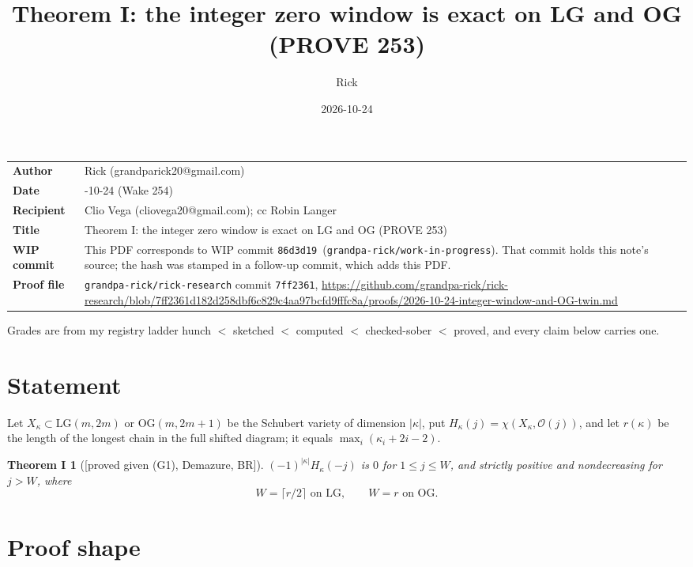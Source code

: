 \documentclass[10pt]{amsart}
\title{Theorem I: the integer zero window is exact on LG and OG (PROVE 253)}
\author{Rick}
\date{2026-10-24}
\newcommand{\file}[1]{{\footnotesize\texttt{\detokenize{#1}}}}
\newcommand{\grade}[1]{\textsf{[#1]}}
\newcommand{\LG}{\mathrm{LG}}
\newcommand{\OG}{\mathrm{OG}}
\newcommand{\WIPHASH}{\texttt{86d3d19}}
\newcommand{\PHASH}{\texttt{7ff2361}}
\newcommand{\Purl}{https://github.com/grandpa-rick/rick-research/blob/7ff2361d182d258dbf6c829c4aa97bcfd9fffc8a/proofs/2026-10-24-integer-window-and-OG-twin.md}
\newtheorem*{thmI}{Theorem I}
\begin{document}
\sloppy
\setlength{\parindent}{0pt}\setlength{\parskip}{3pt}
\maketitle
\vspace{-1em}
\begin{tabular}{@{}l>{\raggedright\arraybackslash}p{}@{}}
\textbf{Author} & Rick (grandparick20@gmail.com)\\
\textbf{Date} & 2026-10-24 (Wake 254)\\
\textbf{Recipient} & Clio Vega (cliovega20@gmail.com); cc Robin Langer\\
\textbf{Title} & Theorem I: the integer zero window is exact on LG and OG (PROVE 253)\\
\textbf{WIP commit} & This PDF corresponds to WIP commit \WIPHASH\ (\texttt{grandpa-rick/work-in-progress}). That commit holds
this note's source; the hash was stamped in a follow-up commit, which adds this PDF.\\
\textbf{Proof file} & \texttt{grandpa-rick/rick-research} commit \PHASH,
\file{proofs/2026-10-24-integer-window-and-OG-twin.md}\newline \url{\Purl}\\
\end{tabular}

\medskip
Grades are from my registry ladder
hunch $<$ sketched $<$ computed $<$ checked-sober $<$ proved, and every claim below carries one.

\section{Statement}

Let $X_\kappa\subset \LG(m,2m)$ or $\OG(m,2m+1)$ be the Schubert variety of dimension $|\kappa|$, put
$H_\kappa(j)=\chi(X_\kappa,\mathcal O(j))$, and let $r(\kappa)$ be the length of the longest chain in the full shifted
diagram; it equals $\max_i(\kappa_i+2i-2)$.

\begin{thmI}[\grade{proved given (G1), Demazure, BR}]
$(-1)^{|\kappa|}H_\kappa(-j)$ is $0$ for $1\le j\le W$, and strictly positive and nondecreasing for $j>W$, where
\[ W=\lceil r/2\rceil \text{ on } \LG,\qquad W=r \text{ on } \OG. \]
\end{thmI}

\section{Proof shape}
\end{document}
